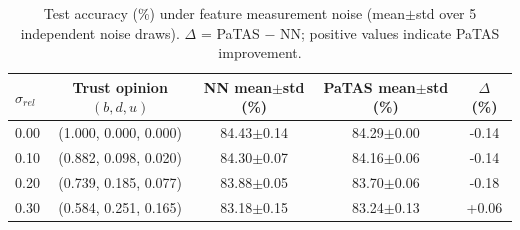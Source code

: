 \begin{table}[ht]
\centering
\caption{Test accuracy (\%) under feature measurement noise (mean$\pm$std over 5 independent noise draws). $\Delta$ = PaTAS $-$ NN; positive values indicate PaTAS improvement.}
\label{tab:feature-noise}
\begin{tabular}{lcccc}
\toprule
$\sigma_{rel}$ & Trust opinion $(b,d,u)$ & NN mean$\pm$std (\%) & PaTAS mean$\pm$std (\%) & $\Delta$ (\%) \\
\midrule
0.00 & (1.000, 0.000, 0.000) & 84.43$\pm$0.14 & 84.29$\pm$0.00 & -0.14 \\
0.10 & (0.882, 0.098, 0.020) & 84.30$\pm$0.07 & 84.16$\pm$0.06 & -0.14 \\
0.20 & (0.739, 0.185, 0.077) & 83.88$\pm$0.05 & 83.70$\pm$0.06 & -0.18 \\
0.30 & (0.584, 0.251, 0.165) & 83.18$\pm$0.15 & 83.24$\pm$0.13 & +0.06 \\
\bottomrule
\end{tabular}
\end{table}
